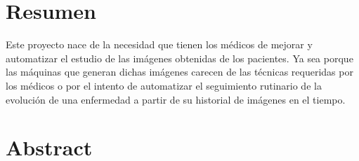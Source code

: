 \section*{Resumen}
Este proyecto nace de la necesidad que tienen los médicos de mejorar y
automatizar el estudio de las imágenes obtenidas de los pacientes. Ya
sea porque las máquinas que generan dichas imágenes carecen de las
técnicas requeridas por los médicos o por el intento de automatizar el
seguimiento rutinario de la evolución de una enfermedad a partir de su
historial de imágenes en el tiempo. \\

\section*{Abstract}
